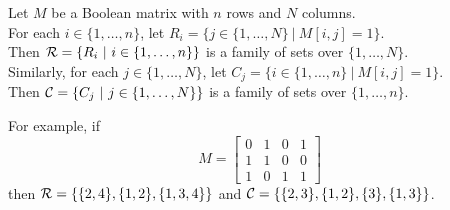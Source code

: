 \documentclass[11pt]{article}
\begin{document}
\begin{question}
Let $M$ be a Boolean matrix with $n$ rows and $N$ columns.\\
For each $i \in \{1,\ldots,n\}$, let $R_i = \{ j \in \{1,\ldots,N\} \ |\
M[i,j] = 1\}$.\\
Then ${\cal R} = \{ R_i \ |\ i \in \{1,\ldots,n\}\}$ is a family
of sets over $\{1,\ldots,N\}$.\\
Similarly, for each $j \in \{1,\ldots,N\}$, let $C_j = \{ i \in \{1,\ldots,n\} \ |\
M[i,j] = 1\}$.\\
Then ${\cal C} = \{ C_j \ |\ j \in \{1,\ldots,N\}\}$ is a family
of sets over $\{1,\ldots,n\}$.

For example, if
$$M = \left [
\begin{array}{cccc}
0 & 1 & 0 & 1\\
1 & 1 & 0 & 0\\
1 & 0 & 1 & 1
\end{array}
\right ]$$
then ${\cal R} = \{\{2,4\}, \{1,2\}, \{1,3,4\}\}$ and
${\cal C} = \{\{2,3\}, \{1,2\}, \{3\}, \{1,3\}\}$.
\end{question}
\end{document}
